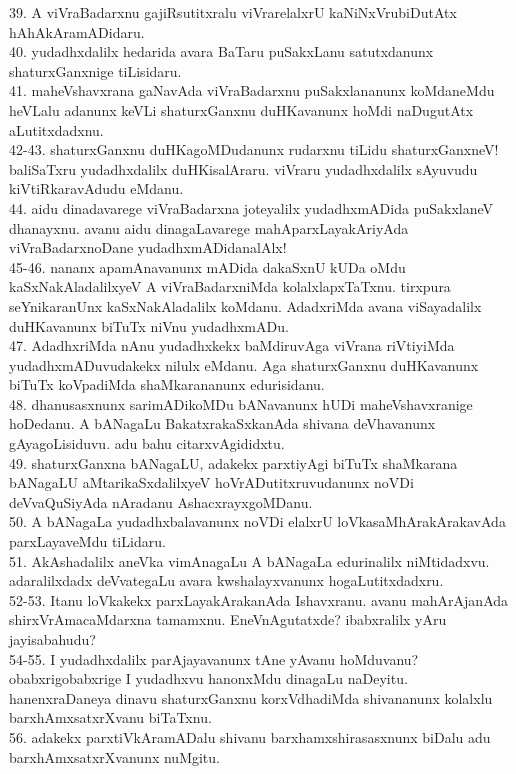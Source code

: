 \documentclass{article}
\begin{document}
39. A viVraBadarxnu gajiRsutitxralu viVrarelalxrU kaNiNxVrubiDutAtx hAhAkAramADidaru.\\
40. yudadhxdalilx hedarida avara BaTaru puSakxLanu satutxdanunx shaturxGanxnige tiLisidaru.\\
41. maheVshavxrana gaNavAda viVraBadarxnu puSakxlananunx koMdaneMdu heVLalu adanunx keVLi shaturxGanxnu duHKavanunx hoMdi naDugutAtx aLutitxdadxnu.\\
42-43. shaturxGanxnu duHKagoMDudanunx rudarxnu tiLidu shaturxGanxneV! baliSaTxru yudadhxdalilx duHKisalAraru. viVraru yudadhxdalilx sAyuvudu kiVtiRkaravAdudu eMdanu.\\
44. aidu dinadavarege viVraBadarxna joteyalilx yudadhxmADida puSakxlaneV dhanayxnu. avanu aidu dinagaLavarege mahAparxLayakAriyAda viVraBadarxnoDane yudadhxmADidanalAlx!\\
45-46. nananx apamAnavanunx mADida dakaSxnU kUDa oMdu kaSxNakAladalilxyeV A viVraBadarxniMda kolalxlapxTaTxnu. tirxpura seYnikaranUnx kaSxNakAladalilx koMdanu. AdadxriMda avana viSayadalilx duHKavanunx biTuTx niVnu yudadhxmADu.\\
47. AdadhxriMda nAnu yudadhxkekx baMdiruvAga viVrana riVtiyiMda yudadhxmADuvudakekx nilulx eMdanu. Aga shaturxGanxnu duHKavanunx biTuTx koVpadiMda shaMkarananunx edurisidanu.\\
48. dhanusasxnunx sarimADikoMDu bANavanunx hUDi maheVshavxranige hoDedanu. A bANagaLu BakatxrakaSxkanAda shivana deVhavanunx gAyagoLisiduvu. adu bahu citarxvAgididxtu.\\
49. shaturxGanxna bANagaLU, adakekx parxtiyAgi biTuTx shaMkarana bANagaLU aMtarikaSxdalilxyeV hoVrADutitxruvudanunx noVDi deVvaQuSiyAda nAradanu AshacxrayxgoMDanu.\\
50. A bANagaLa yudadhxbalavanunx noVDi elalxrU loVkasaMhArakArakavAda parxLayaveMdu tiLidaru.\\
51. AkAshadalilx aneVka vimAnagaLu A bANagaLa edurinalilx niMtidadxvu. adaralilxdadx deVvategaLu avara kwshalayxvanunx hogaLutitxdadxru.\\
52-53. Itanu loVkakekx parxLayakArakanAda Ishavxranu. avanu mahArAjanAda shirxVrAmacaMdarxna tamamxnu. EneVnAgutatxde? ibabxralilx yAru jayisabahudu?\\
54-55. I yudadhxdalilx parAjayavanunx tAne yAvanu hoMduvanu? obabxrigobabxrige I yudadhxvu hanonxMdu dinagaLu naDeyitu. hanenxraDaneya dinavu shaturxGanxnu korxVdhadiMda shivananunx kolalxlu barxhAmxsatxrXvanu biTaTxnu.\\
56. adakekx parxtiVkAramADalu shivanu barxhamxshirasasxnunx biDalu adu barxhAmxsatxrXvanunx nuMgitu.\\
\end{document}
